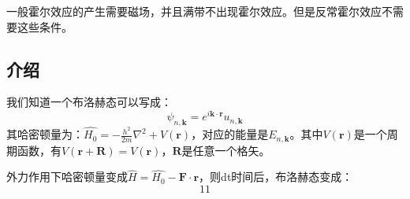 \begin{issues}
\issueDraft
\end{issues}
一般霍尔效应的产生需要磁场，并且满带不出现霍尔效应。但是反常霍尔效应不需要这些条件。
\subsection{介绍}
我们知道一个布洛赫态可以写成：
\begin{equation}
\psi_{n,\boldsymbol{k}}=e^{i\boldsymbol{k}\cdot\boldsymbol{r}}u_{n,\boldsymbol{k}}
\end{equation}
其哈密顿量为：$\widehat{H_0}=-\frac{h^2}{2m}\nabla^2+V(\boldsymbol{r})$，对应的能量是$E_{n,\boldsymbol{k}}$。其中$V(\boldsymbol{r})$是一个周期函数，有$V(\boldsymbol{r}+\boldsymbol{R})=V(\boldsymbol{r})$，$\boldsymbol{R}$是任意一个格矢。

外力作用下哈密顿量变成$\widehat{H}=\widehat{H_0}-\boldsymbol{F}\cdot\boldsymbol{r}$，则dt时间后，布洛赫态变成：
\begin{equation}
11
\end{equation}

